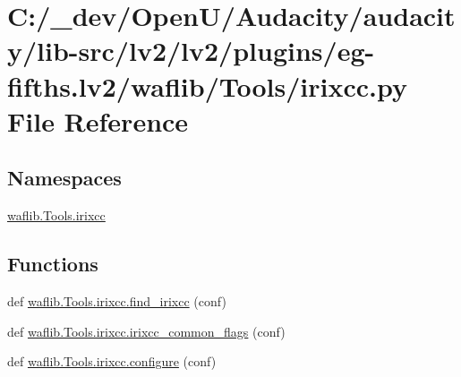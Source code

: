 \hypertarget{lv2_2plugins_2eg-fifths_8lv2_2waflib_2_tools_2irixcc_8py}{}\section{C\+:/\+\_\+dev/\+Open\+U/\+Audacity/audacity/lib-\/src/lv2/lv2/plugins/eg-\/fifths.lv2/waflib/\+Tools/irixcc.py File Reference}
\label{lv2_2plugins_2eg-fifths_8lv2_2waflib_2_tools_2irixcc_8py}
\subsection*{Namespaces}
\begin{DoxyCompactItemize}
\item 
 \hyperlink{namespacewaflib_1_1_tools_1_1irixcc}{waflib.\+Tools.\+irixcc}
\end{DoxyCompactItemize}
\subsection*{Functions}
\begin{DoxyCompactItemize}
\item 
def \hyperlink{namespacewaflib_1_1_tools_1_1irixcc_a1b02ebdb6204ff3322531ba515fe187c}{waflib.\+Tools.\+irixcc.\+find\+\_\+irixcc} (conf)
\item 
def \hyperlink{namespacewaflib_1_1_tools_1_1irixcc_a636ab22dd5bfc5c90d23c109ff5c482f}{waflib.\+Tools.\+irixcc.\+irixcc\+\_\+common\+\_\+flags} (conf)
\item 
def \hyperlink{namespacewaflib_1_1_tools_1_1irixcc_a9f81cd5d34e60c61913d7de7bb9bd224}{waflib.\+Tools.\+irixcc.\+configure} (conf)
\end{DoxyCompactItemize}
